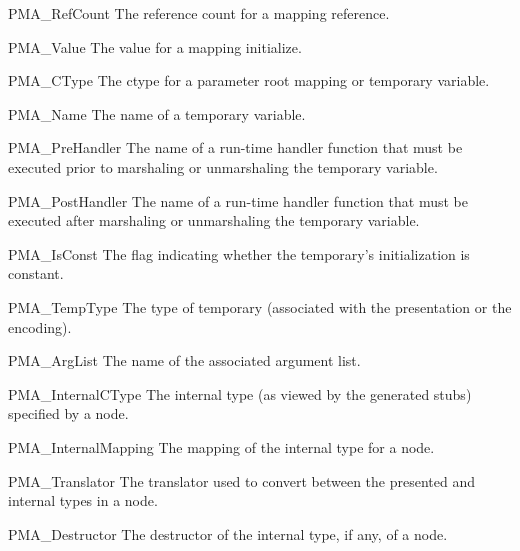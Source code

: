\begin{cprototypelist}
\begin{cidentifierlist}
    \item[PMA_RefCount]  The reference count for a
    mapping reference.

    \item[PMA_Value]  The value for a mapping
    initialize.

    \item[PMA_CType]  The ctype for a
    parameter root mapping or temporary variable.

    \item[PMA_Name]  The name of a temporary
    variable.

    \item[PMA_PreHandler]  The name of a run-time
    handler function that must be executed prior to marshaling or unmarshaling
    the temporary variable.

    \item[PMA_PostHandler]  The name of a
    run-time handler function that must be executed after marshaling or
    unmarshaling the temporary variable.

    \item[PMA_IsConst]  The flag indicating whether
    the temporary's initialization is constant.

    \item[PMA_TempType]  The type
    of temporary (associated with the presentation or the encoding).

    \item[PMA_ArgList]  The name of the
    associated argument list.

    \item[PMA_InternalCType]  The internal
    type (as viewed by the generated stubs) specified by a
     node.

    \item[PMA_InternalMapping]  The
    mapping of the internal type for a  node.

    \item[PMA_Translator]  The translator used to
    convert between the presented and internal types in a
     node.

    \item[PMA_Destructor]  The destructor of the
    internal type, if any, of a  node.
  \end{cidentifierlist}


\end{cprototypelist}
